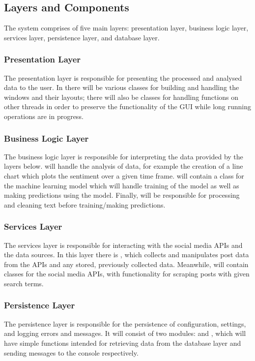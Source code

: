     \subsection{Layers and Components}
    The system comprises of five main layers: presentation layer, business logic layer, services layer, persistence layer, and database layer.

        \subsubsection{Presentation Layer}
        The presentation layer is responsible for presenting the processed and analysed data to the user. In  there will be various classes for building and handling the windows and their layouts; there will also be classes for handling functions on other threads in order to preserve the functionality of the GUI while long running operations are in progress.

        \subsubsection{Business Logic Layer}
        The business logic layer is responsible for interpreting the data provided by the layers below.  will handle the analysis of data, for example the creation of a line chart which plots the sentiment over a given time frame.  will contain a class for the machine learning model which will handle training of the model as well as making predictions using the model. Finally,  will be responsible for processing and cleaning text before training/making predictions.

        \subsubsection{Services Layer}
        The services layer is responsible for interacting with the social media APIs and the data sources. In this layer there is , which collects and manipulates post data from the APIs and any stored, previously collected data. Meanwhile,  will contain classes for the social media APIs, with functionality for scraping posts with given search terms.

        \subsubsection{Persistence Layer}
        The persistence layer is responsible for the persistence of configuration, settings, and logging errors and messages. It will consist of two modules:  and , which will have simple functions intended for retrieving data from the database layer and sending messages to the console respectively.

